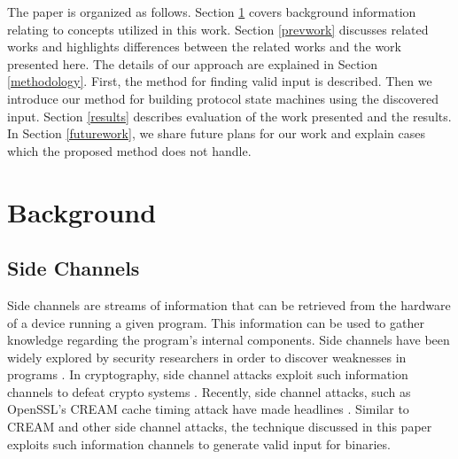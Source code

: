 \documentclass{acm_proc_article-sp}
\begin{document}
The paper is organized as follows.
Section \ref{background} covers background information relating to concepts utilized in this work.
Section \ref{prevwork} discusses related works and highlights differences between the related works and the work presented here.
The details of our approach are explained in Section \ref{methodology}. First, the method for finding valid input is described. Then we introduce our method for building protocol state machines using the discovered input.
Section \ref{results} describes evaluation of the work presented and the results.
In Section \ref{futurework}, we share future plans for our work and explain cases which the proposed method does not handle.


\section{Background} \label{background}
\subsection{Side Channels} \label{bg_sidechannels}
Side channels are streams of information that can be retrieved from the hardware of a device running a given program.
This information can be used to gather knowledge regarding the program's internal components.
Side channels have been widely explored by security researchers in order to discover weaknesses in programs \cite{weinbergside, schindler2002combined, genkin2014rsa, genkinstealing}.
In cryptography, side channel attacks exploit such information channels to defeat crypto systems \cite{zhou2005side, black2002black, okeya2006side}.
Recently, side channel attacks, such as OpenSSL's CREAM cache timing attack have made headlines \cite{creamssl}.
Similar to CREAM and other side channel attacks, the technique discussed in this paper exploits such information channels to generate valid input for binaries.
\end{document}
